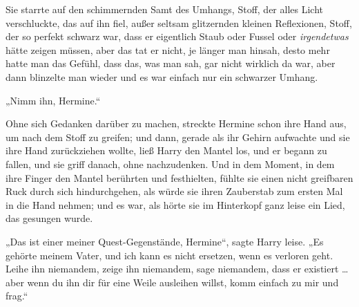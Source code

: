 Sie starrte auf den schimmernden Samt des Umhangs, Stoff, der alles Licht verschluckte, das auf ihn fiel, außer seltsam glitzernden kleinen Reflexionen, Stoff, der so perfekt schwarz war, dass er eigentlich Staub oder Fussel oder \emph{irgendetwas} hätte zeigen müssen, aber das tat er nicht, je länger man hinsah, desto mehr hatte man das Gefühl, dass das, was man sah, gar nicht wirklich da war, aber dann blinzelte man wieder und es war einfach nur ein schwarzer Umhang.

„Nimm ihn, Hermine.“

Ohne sich Gedanken darüber zu machen, streckte Hermine schon ihre Hand aus, um nach dem Stoff zu greifen; und dann, gerade als ihr Gehirn aufwachte und sie ihre Hand zurückziehen wollte, ließ Harry den Mantel los, und er begann zu fallen, und sie griff danach, ohne nachzudenken. Und in dem Moment, in dem ihre Finger den Mantel berührten und festhielten, fühlte sie einen nicht greifbaren Ruck durch sich hindurchgehen, als würde sie ihren Zauberstab zum ersten Mal in die Hand nehmen; und es war, als hörte sie im Hinterkopf ganz leise ein Lied, das gesungen wurde.

„Das ist einer meiner Quest-Gegenstände, Hermine“, sagte Harry leise.
„Es gehörte meinem Vater, und ich kann es nicht ersetzen, wenn es verloren geht. Leihe ihn niemandem, zeige ihn niemandem, sage niemandem, dass er existiert … aber wenn du ihn dir für eine Weile ausleihen willst, komm einfach zu mir und frag.“

